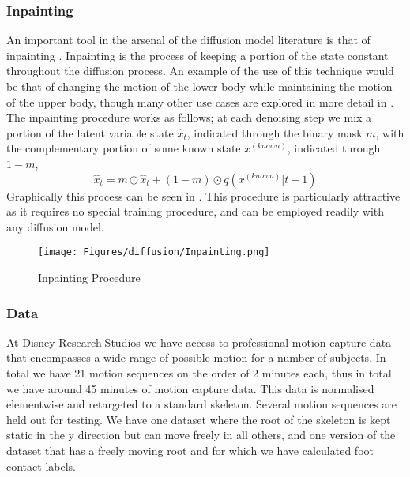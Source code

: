 \subsubsection{Inpainting}
\label{sec:diffusion_method_inpainting}

An important tool in the arsenal of the diffusion model literature is that of inpainting \cite{diffusion_inpainting}. Inpainting is the process of keeping a portion of the state constant throughout the diffusion process. An example of the use of this technique would be that of changing the motion of the lower body while maintaining the motion of the upper body, though many other use cases are explored in more detail in . The inpainting procedure works as follows; at each denoising step we mix a portion of the latent variable state $\hat{x}_t$, indicated through the binary mask $m$, with the complementary portion of some known state $x^{(known)}$, indicated through $1-m$, 
\begin{equation}
    \hat{x}_{t} = m \odot \hat{x}_t + (1-m) \odot q(x^{(known)}|t-1)
\end{equation}
Graphically this process can be seen in . This procedure is particularly attractive as it requires no special training procedure, and can be employed readily with any diffusion model.

\begin{figure}[!ht]
    \centering
    \texttt{[image: Figures/diffusion/Inpainting.png]}
    \caption{Inpainting Procedure}
    \label{fig:inpainting}
\end{figure}


\subsubsection{Data}
At Disney Research|Studios we have access to professional motion capture data that encompasses a wide range of possible motion for a number of subjects. In total we have 21 motion sequences on the order of 2 minutes each, thus in total we have around 45 minutes of motion capture data. This data is normalised elementwise and retargeted to a standard skeleton. Several motion sequences are held out for testing.
We have one dataset where the root of the skeleton is kept static in the y direction but can move freely in all others, and one version of the dataset that has a freely moving root and for which we have calculated foot contact labels.
